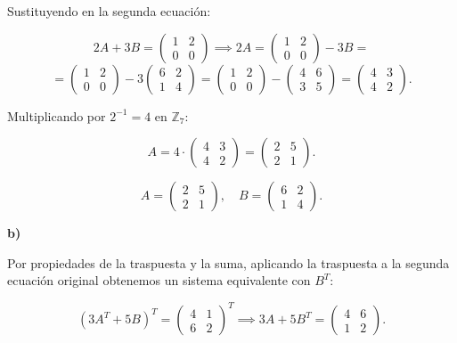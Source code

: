 \documentclass[a4paper,12pt]{article}
\begin{document}
\begin{ejercicio}[title=Ejercicio 5]
Sustituyendo en la segunda ecuación:

\[
2A + 3B = 
\begin{pmatrix}
1 & 2\\
0 & 0
\end{pmatrix} 
\implies
2A = 
\begin{pmatrix}
1 & 2\\
0 & 0
\end{pmatrix} - 3B 
=
\]
\[=
\begin{pmatrix}
1 & 2\\
0 & 0
\end{pmatrix} - 
3 \begin{pmatrix}
6 & 2\\
1 & 4
\end{pmatrix}
=
\begin{pmatrix}
1 & 2\\
0 & 0
\end{pmatrix} - 
\begin{pmatrix}
4 & 6\\
3 & 5
\end{pmatrix}
=
\begin{pmatrix}
4 & 3\\
4 & 2
\end{pmatrix}.
\]

\vspace{0.5em}

Multiplicando por $2^{-1} = 4$ en $\mathbb{Z}_7$:

\[
A = 4 \cdot 
\begin{pmatrix}
4 & 3\\
4 & 2
\end{pmatrix} =
\begin{pmatrix}
2 & 5\\
2 & 1
\end{pmatrix}.
\]

\[
\boxed{A = \begin{pmatrix}2 & 5\\ 2 & 1\end{pmatrix}}, \quad 
\boxed{B = \begin{pmatrix}6 & 2\\ 1 & 4\end{pmatrix}}.
\]

\textbf{b)}

\vspace{0.5em}

Por propiedades de la traspuesta y la suma, aplicando la traspuesta a la segunda ecuación original obtenemos un sistema equivalente con \(B^T\):

\[
(3A^T + 5B)^T = 
\begin{pmatrix}
4 & 1\\
6 & 2
\end{pmatrix}^T
\implies
3A + 5B^T =
\begin{pmatrix}
4 & 6\\
1 & 2
\end{pmatrix}.
\]

\end{ejercicio}
\end{document}
